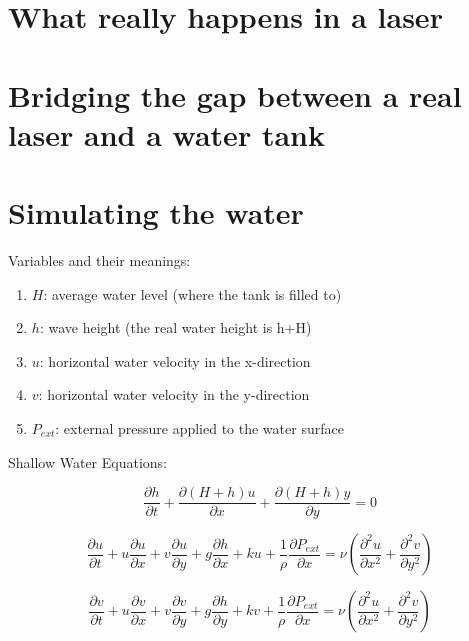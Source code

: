 \documentclass{article}
\begin{document}
\section{What really happens in a laser}

\section{Bridging the gap between a real laser and a water tank}

\section{Simulating the water}

Variables and their meanings:

\begin{enumerate}
    \item $H$: average water level (where the tank is filled to)
    \item $h$: wave height (the real water height is h+H)
    \item $u$: horizontal water velocity in the x-direction
    \item $v$: horizontal water velocity in the y-direction
    \item $P_{ext}$: external pressure applied to the water surface
\end{enumerate}

Shallow Water Equations:

\begin{equation}
    \frac{\partial h}{\partial t} + \frac{\partial (H + h) u}{\partial x} + \frac{\partial (H + h) y}{\partial y} = 0
\end{equation}

\begin{equation}
    \frac{\partial u}{\partial t} + u \frac{\partial u}{\partial x} + v \frac{\partial u}{\partial y} + g \frac{\partial h}{\partial x} + ku + \frac{1}{\rho} \frac{\partial P_{ext}}{\partial x} = \nu \left( \frac{\partial^2 u}{\partial x^2} + \frac{\partial^2 v}{\partial y^2} \right)
\end{equation}

\begin{equation}
    \frac{\partial v}{\partial t} + u \frac{\partial v}{\partial x} + v \frac{\partial v}{\partial y} + g \frac{\partial h}{\partial y} + kv + \frac{1}{\rho} \frac{\partial P_{ext}}{\partial x} = \nu \left( \frac{\partial^2 u}{\partial x^2} + \frac{\partial^2 v}{\partial y^2} \right)
\end{equation}
\end{document}

